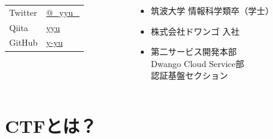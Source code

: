 \begin{frame}
\begin{columns}
\begin{column}{0.4\textwidth}
      \begin{table}[h]
        \begin{tabular}{ll}
          Twitter & \href{https://twitter.com/\_yyu\_}{@\_yyu\_} \\
          Qiita &  \href{https://qiita.com/yyu}{yyu} \\
          GitHub &  \href{https://github.com/y-yu}{y-yu} \\
        \end{tabular}
      \end{table}
    \end{column}
    \begin{column}{0.6\textwidth}
      \begin{itemize}
        \item<2-> 筑波大学 情報科学類卒（学士）
        \item<3-> 株式会社ドワンゴ 入社
        \item<4-> 第二サービス開発本部 \\
          Dwango Cloud Service部 \\
          認証基盤セクション
      \end{itemize}
    \end{column}
  \end{columns}
\end{frame}

\section{CTFとは？}

